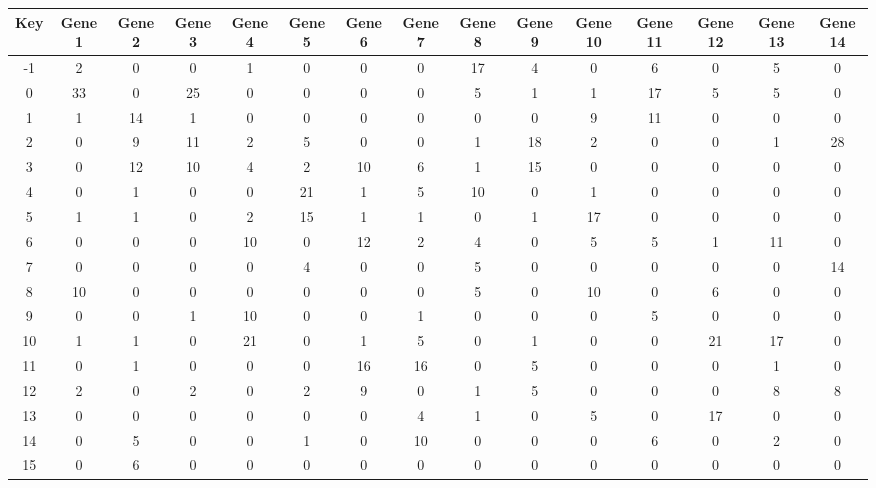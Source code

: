 \begin{tabular}{|c|c|c|c|c|c|c|c|c|c|c|c|c|c|c|}
\hline
Key & Gene 1 & Gene 2 & Gene 3 & Gene 4 & Gene 5 & Gene 6 & Gene 7 & Gene 8 & Gene 9 & Gene 10 & Gene 11 & Gene 12 & Gene 13 & Gene 14 \\
\hline
-1 & 2 & 0 & 0 & 1 & 0 & 0 & 0 & 17 & 4 & 0 & 6 & 0 & 5 & 0 \\
0 & 33 & 0 & 25 & 0 & 0 & 0 & 0 & 5 & 1 & 1 & 17 & 5 & 5 & 0 \\
1 & 1 & 14 & 1 & 0 & 0 & 0 & 0 & 0 & 0 & 9 & 11 & 0 & 0 & 0 \\
2 & 0 & 9 & 11 & 2 & 5 & 0 & 0 & 1 & 18 & 2 & 0 & 0 & 1 & 28 \\
3 & 0 & 12 & 10 & 4 & 2 & 10 & 6 & 1 & 15 & 0 & 0 & 0 & 0 & 0 \\
4 & 0 & 1 & 0 & 0 & 21 & 1 & 5 & 10 & 0 & 1 & 0 & 0 & 0 & 0 \\
5 & 1 & 1 & 0 & 2 & 15 & 1 & 1 & 0 & 1 & 17 & 0 & 0 & 0 & 0 \\
6 & 0 & 0 & 0 & 10 & 0 & 12 & 2 & 4 & 0 & 5 & 5 & 1 & 11 & 0 \\
7 & 0 & 0 & 0 & 0 & 4 & 0 & 0 & 5 & 0 & 0 & 0 & 0 & 0 & 14 \\
8 & 10 & 0 & 0 & 0 & 0 & 0 & 0 & 5 & 0 & 10 & 0 & 6 & 0 & 0 \\
9 & 0 & 0 & 1 & 10 & 0 & 0 & 1 & 0 & 0 & 0 & 5 & 0 & 0 & 0 \\
10 & 1 & 1 & 0 & 21 & 0 & 1 & 5 & 0 & 1 & 0 & 0 & 21 & 17 & 0 \\
11 & 0 & 1 & 0 & 0 & 0 & 16 & 16 & 0 & 5 & 0 & 0 & 0 & 1 & 0 \\
12 & 2 & 0 & 2 & 0 & 2 & 9 & 0 & 1 & 5 & 0 & 0 & 0 & 8 & 8 \\
13 & 0 & 0 & 0 & 0 & 0 & 0 & 4 & 1 & 0 & 5 & 0 & 17 & 0 & 0 \\
14 & 0 & 5 & 0 & 0 & 1 & 0 & 10 & 0 & 0 & 0 & 6 & 0 & 2 & 0 \\
15 & 0 & 6 & 0 & 0 & 0 & 0 & 0 & 0 & 0 & 0 & 0 & 0 & 0 & 0 \\
\hline
\end{tabular}
